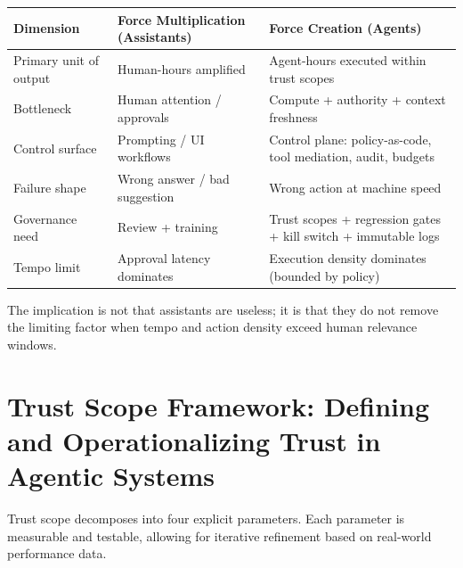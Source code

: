 \documentclass[11pt]{article}
\begin{document}
\begin{center}
\begin{tabularx}{\textwidth}{p{}X X}
\textbf{Dimension} & \textbf{Force Multiplication (Assistants)} & \textbf{Force Creation (Agents)}\\\hline
Primary unit of output & Human-hours amplified & Agent-hours executed within trust scopes\\
Bottleneck & Human attention / approvals & Compute + authority + context freshness\\
Control surface & Prompting / UI workflows & Control plane: policy-as-code, tool mediation, audit, budgets\\
Failure shape & Wrong answer / bad suggestion & Wrong action at machine speed\\
Governance need & Review + training & Trust scopes + regression gates + kill switch + immutable logs\\
Tempo limit & Approval latency dominates & Execution density dominates (bounded by policy)\\
\end{tabularx}
\end{center}

The implication is not that assistants are useless; it is that they do not remove the limiting factor when tempo and action density exceed human relevance windows.


\section{Trust Scope Framework: Defining and Operationalizing Trust in Agentic Systems}\label{trust-scope-framework-defining-and-operationalizing-trust-in-agentic-systems}

Trust scope decomposes into four explicit parameters. Each parameter is measurable and testable, allowing for iterative refinement based on real-world performance data.
\end{document}
